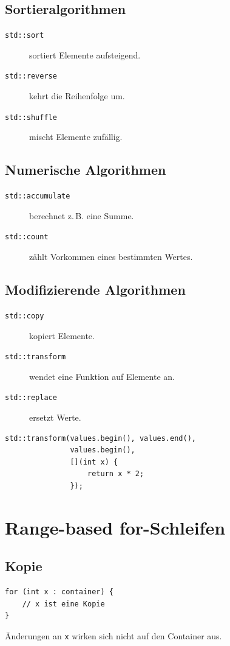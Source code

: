 \documentclass[11pt,a4paper]{article}
\newcommand{\code}[1]{\texttt{#1}}
\begin{document}
\subsection{Sortieralgorithmen}
\begin{description}
  \item[\code{std::sort}] sortiert Elemente aufsteigend.
  \item[\code{std::reverse}] kehrt die Reihenfolge um.
  \item[\code{std::shuffle}] mischt Elemente zufällig.
\end{description}

\subsection{Numerische Algorithmen}
\begin{description}
  \item[\code{std::accumulate}] berechnet z.\,B. eine Summe.
  \item[\code{std::count}] zählt Vorkommen eines bestimmten Wertes.
\end{description}

\subsection{Modifizierende Algorithmen}
\begin{description}
  \item[\code{std::copy}] kopiert Elemente.
  \item[\code{std::transform}] wendet eine Funktion auf Elemente an.
  \item[\code{std::replace}] ersetzt Werte.
\end{description}

\begin{lstlisting}[caption={std::transform mit Lambda}]
std::transform(values.begin(), values.end(),
               values.begin(),
               [](int x) {
                   return x * 2;
               });
\end{lstlisting}

\section{Range-based for-Schleifen}

\subsection{Kopie}
\begin{lstlisting}[caption={for-each mit Kopie}]
for (int x : container) {
    // x ist eine Kopie
}
\end{lstlisting}
Änderungen an \code{x} wirken sich nicht auf den Container aus.
\end{document}
